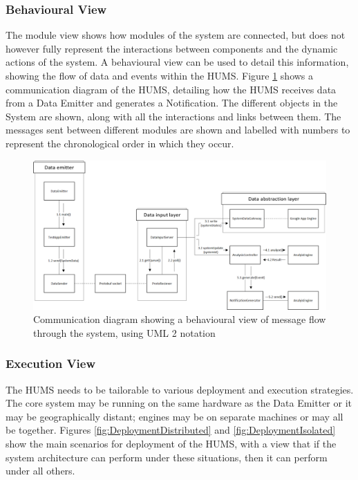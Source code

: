 \documentclass[10pt,a4paper]{article}
\begin{document}
\subsubsection{Behavioural View}

The module view shows how modules of the system are connected, but does not
however fully represent the interactions between components and the dynamic actions of the system. A behavioural view can be used to detail this information, showing the flow of data and events within the HUMS. Figure \ref{fig:CommunicationDiagram} shows a communication diagram of the 
HUMS, detailing how the HUMS receives data from a Data Emitter and generates a Notification. The different objects in the System are shown, along with all the interactions and links between them. The messages sent between different modules are shown and labelled with numbers to represent the chronological order in which they occur.

\begin{figure}[!ht]
  \centering
  \includegraphics[width=14cm]{images/CommunicationDiagram.png}
  \caption{Communication diagram showing a behavioural view of message 
flow through the system, using UML 2 notation}
  \label{fig:CommunicationDiagram}
\end{figure}

\subsubsection{Execution View}
The HUMS needs to be tailorable to various deployment and execution strategies. The core system may be running on the same hardware as the Data Emitter or it may be geographically distant; engines may be on separate machines or may all be together. Figures \ref{fig:DeploymentDistributed} and \ref{fig:DeploymentIsolated} show the main scenarios for deployment of the HUMS, with a view that if the system architecture can perform under these situations, then it can perform under all others.
\end{document}
